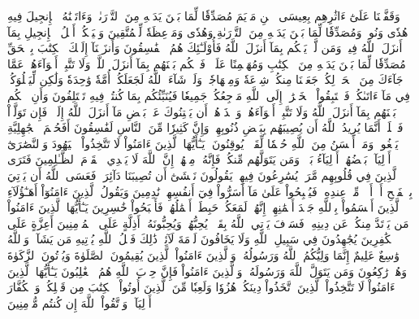 وَقَفَّيۡنَا عَلَىٰٓ ءَاثَٰرِهِم بِعِيسَى ٱبۡنِ مَرۡيَمَ مُصَدِّقٗا لِّمَا بَيۡنَ يَدَيۡهِ مِنَ ٱلتَّوۡرَىٰةِۖ وَءَاتَيۡنَٰهُ ٱلۡإِنجِيلَ فِيهِ هُدٗى وَنُورٞ وَمُصَدِّقٗا لِّمَا بَيۡنَ يَدَيۡهِ مِنَ ٱلتَّوۡرَىٰةِ وَهُدٗى وَمَوۡعِظَةٗ لِّلۡمُتَّقِينَ
وَلۡيَحۡكُمۡ أَهۡلُ ٱلۡإِنجِيلِ بِمَآ أَنزَلَ ٱللَّهُ فِيهِۚ وَمَن لَّمۡ يَحۡكُم بِمَآ أَنزَلَ ٱللَّهُ فَأُوْلَـٰٓئِكَ هُمُ ٱلۡفَٰسِقُونَ
وَأَنزَلۡنَآ إِلَيۡكَ ٱلۡكِتَٰبَ بِٱلۡحَقِّ مُصَدِّقٗا لِّمَا بَيۡنَ يَدَيۡهِ مِنَ ٱلۡكِتَٰبِ وَمُهَيۡمِنًا عَلَيۡهِۖ فَٱحۡكُم بَيۡنَهُم بِمَآ أَنزَلَ ٱللَّهُۖ وَلَا تَتَّبِعۡ أَهۡوَآءَهُمۡ عَمَّا جَآءَكَ مِنَ ٱلۡحَقِّۚ لِكُلّٖ جَعَلۡنَا مِنكُمۡ شِرۡعَةٗ وَمِنۡهَاجٗاۚ وَلَوۡ شَآءَ ٱللَّهُ لَجَعَلَكُمۡ أُمَّةٗ وَٰحِدَةٗ وَلَٰكِن لِّيَبۡلُوَكُمۡ فِي مَآ ءَاتَىٰكُمۡۖ فَٱسۡتَبِقُواْ ٱلۡخَيۡرَٰتِۚ إِلَى ٱللَّهِ مَرۡجِعُكُمۡ جَمِيعٗا فَيُنَبِّئُكُم بِمَا كُنتُمۡ فِيهِ تَخۡتَلِفُونَ
وَأَنِ ٱحۡكُم بَيۡنَهُم بِمَآ أَنزَلَ ٱللَّهُ وَلَا تَتَّبِعۡ أَهۡوَآءَهُمۡ وَٱحۡذَرۡهُمۡ أَن يَفۡتِنُوكَ عَنۢ بَعۡضِ مَآ أَنزَلَ ٱللَّهُ إِلَيۡكَۖ فَإِن تَوَلَّوۡاْ فَٱعۡلَمۡ أَنَّمَا يُرِيدُ ٱللَّهُ أَن يُصِيبَهُم بِبَعۡضِ ذُنُوبِهِمۡۗ وَإِنَّ كَثِيرٗا مِّنَ ٱلنَّاسِ لَفَٰسِقُونَ
أَفَحُكۡمَ ٱلۡجَٰهِلِيَّةِ يَبۡغُونَۚ وَمَنۡ أَحۡسَنُ مِنَ ٱللَّهِ حُكۡمٗا لِّقَوۡمٖ يُوقِنُونَ
۞يَـٰٓأَيُّهَا ٱلَّذِينَ ءَامَنُواْ لَا تَتَّخِذُواْ ٱلۡيَهُودَ وَٱلنَّصَٰرَىٰٓ أَوۡلِيَآءَۘ بَعۡضُهُمۡ أَوۡلِيَآءُ بَعۡضٖۚ وَمَن يَتَوَلَّهُم مِّنكُمۡ فَإِنَّهُۥ مِنۡهُمۡۗ إِنَّ ٱللَّهَ لَا يَهۡدِي ٱلۡقَوۡمَ ٱلظَّـٰلِمِينَ
فَتَرَى ٱلَّذِينَ فِي قُلُوبِهِم مَّرَضٞ يُسَٰرِعُونَ فِيهِمۡ يَقُولُونَ نَخۡشَىٰٓ أَن تُصِيبَنَا دَآئِرَةٞۚ فَعَسَى ٱللَّهُ أَن يَأۡتِيَ بِٱلۡفَتۡحِ أَوۡ أَمۡرٖ مِّنۡ عِندِهِۦ فَيُصۡبِحُواْ عَلَىٰ مَآ أَسَرُّواْ فِيٓ أَنفُسِهِمۡ نَٰدِمِينَ
وَيَقُولُ ٱلَّذِينَ ءَامَنُوٓاْ أَهَـٰٓؤُلَآءِ ٱلَّذِينَ أَقۡسَمُواْ بِٱللَّهِ جَهۡدَ أَيۡمَٰنِهِمۡ إِنَّهُمۡ لَمَعَكُمۡۚ حَبِطَتۡ أَعۡمَٰلُهُمۡ فَأَصۡبَحُواْ خَٰسِرِينَ
يَـٰٓأَيُّهَا ٱلَّذِينَ ءَامَنُواْ مَن يَرۡتَدَّ مِنكُمۡ عَن دِينِهِۦ فَسَوۡفَ يَأۡتِي ٱللَّهُ بِقَوۡمٖ يُحِبُّهُمۡ وَيُحِبُّونَهُۥٓ أَذِلَّةٍ عَلَى ٱلۡمُؤۡمِنِينَ أَعِزَّةٍ عَلَى ٱلۡكَٰفِرِينَ يُجَٰهِدُونَ فِي سَبِيلِ ٱللَّهِ وَلَا يَخَافُونَ لَوۡمَةَ لَآئِمٖۚ ذَٰلِكَ فَضۡلُ ٱللَّهِ يُؤۡتِيهِ مَن يَشَآءُۚ وَٱللَّهُ وَٰسِعٌ عَلِيمٌ
إِنَّمَا وَلِيُّكُمُ ٱللَّهُ وَرَسُولُهُۥ وَٱلَّذِينَ ءَامَنُواْ ٱلَّذِينَ يُقِيمُونَ ٱلصَّلَوٰةَ وَيُؤۡتُونَ ٱلزَّكَوٰةَ وَهُمۡ رَٰكِعُونَ
وَمَن يَتَوَلَّ ٱللَّهَ وَرَسُولَهُۥ وَٱلَّذِينَ ءَامَنُواْ فَإِنَّ حِزۡبَ ٱللَّهِ هُمُ ٱلۡغَٰلِبُونَ
يَـٰٓأَيُّهَا ٱلَّذِينَ ءَامَنُواْ لَا تَتَّخِذُواْ ٱلَّذِينَ ٱتَّخَذُواْ دِينَكُمۡ هُزُوٗا وَلَعِبٗا مِّنَ ٱلَّذِينَ أُوتُواْ ٱلۡكِتَٰبَ مِن قَبۡلِكُمۡ وَٱلۡكُفَّارَ أَوۡلِيَآءَۚ وَٱتَّقُواْ ٱللَّهَ إِن كُنتُم مُّؤۡمِنِينَ
